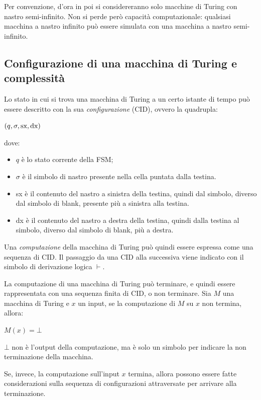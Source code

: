 Per convenzione, d'ora in poi si considereranno solo macchine di Turing con
nastro semi-infinito. Non si perde però capacità computazionale:
qualsiasi macchina a nastro infinito può essere simulata con una macchina a
nastro semi-infinito.

\subsection*{Configurazione di una macchina di Turing e complessità}
Lo stato in cui si trova una macchina di Turing a un certo istante di tempo può
essere descritto con la sua \textit{configurazione} (CID), ovvero la quadrupla:
\begin{center}
    $(q, \sigma, \textnormal{sx}, \textnormal{dx})$
\end{center}
dove:
\begin{itemize}
    \item $q$ è lo stato corrente della FSM;
    \item $\sigma$ è il simbolo di nastro presente nella cella puntata dalla
    testina.
    \item sx è il contenuto del nastro a sinistra della testina, quindi dal
    simbolo, diverso dal simbolo di blank, presente più a sinistra alla testina.
    \item dx è il contenuto del nastro a destra della testina, quindi dalla
    testina al simbolo, diverso dal simbolo di blank, più a destra.
\end{itemize}

Una \textit{computazione} della macchina di Turing può quindi essere espressa
come una sequenza di CID.
Il passaggio da una CID alla successiva viene indicato con il simbolo di
derivazione logica $\vdash$.

La computazione di una macchina di Turing può terminare, e quindi essere
rappresentata con una sequenza finita di CID, o non terminare.
Sia $M$ una macchina di Turing e $x$ un input, se la computazione di $M$
su $x$ non termina, allora:
\begin{center}
    $M(x) = \bot$
\end{center}
$\bot$ non è l'output della computazione, ma è solo un simbolo per indicare
la non terminazione della macchina.

Se, invece, la computazione sull'input $x$ termina, allora possono essere
fatte considerazioni sulla sequenza di configurazioni attraversate per arrivare
alla terminazione.


